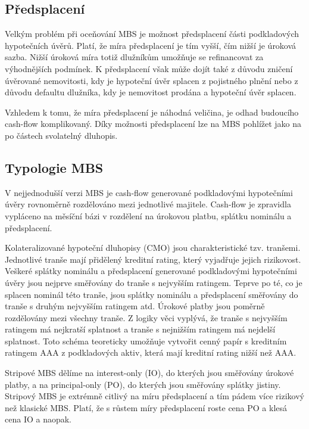 \documentclass[a4paper]{book}
\begin{document}
\subsection{Předsplacení}

Velkým problém při oceňování MBS je možnost předsplacení části podkladových hypotečních úvěrů. Platí, že míra předsplacení je tím vyšší, čím nižší je úroková sazba. Nižší úroková míra totiž dlužníkům umožňuje se refinancovat za výhodnějších podmínek. K předsplacení však může dojít také z důvodu zničení úvěrované nemovitosti, kdy je hypoteční úvěr splacen z pojistného plnění nebo z důvodu defaultu dlužníka, kdy je nemovitost prodána a hypoteční úvěr splacen.

Vzhledem k tomu, že míra předsplacení je náhodná veličina, je odhad budoucího cash-flow komplikovaný. Díky možnosti předsplacení lze na MBS pohlížet jako na po částech svolatelný dluhopis.

\subsection{Typologie MBS}

V nejjednodušší verzi MBS je cash-flow generované podkladovými hypotečními úvěry rovnoměrně rozdělováno mezi jednotlivé majitele. Cash-flow je zpravidla vypláceno na měsíční bázi v rozdělení na úrokovou platbu, splátku nominálu a předsplacení.

Kolateralizované hypoteční dluhopisy (CMO) jsou charakteristické tzv. tranšemi. Jednotlivé tranše mají přidělený kreditní rating, který vyjadřuje jejich rizikovost. Veškeré splátky nominálu a předsplacení generované podkladovými hypotečními úvěry jsou nejprve směřovány do tranše s nejvyšším ratingem. Teprve po té, co je splacen nominál této tranše, jsou splátky nominálu a předsplacení směřovány do tranše s druhým nejvyšším ratingem atd. Úrokové platby jsou poměrně rozdělovány mezi všechny tranše. Z logiky věci vyplývá, že tranše s nejvyšším ratingem má nejkratší splatnost a tranše s nejnižším ratingem má nejdelší splatnost. Toto schéma teoreticky umožňuje vytvořit cenný papír s kreditním ratingem AAA z podkladových aktiv, která mají kreditní rating nižší než AAA.

Stripové MBS dělíme na interest-only (IO), do kterých jsou směřovány úrokové platby, a na principal-only (PO), do kterých jsou směřovány splátky jistiny. Stripový MBS je extrémně citlivý na míru předsplacení a tím pádem více rizikový než klasické MBS. Platí, že s růstem míry předsplacení roste cena PO a klesá cena IO a naopak.
\end{document}
